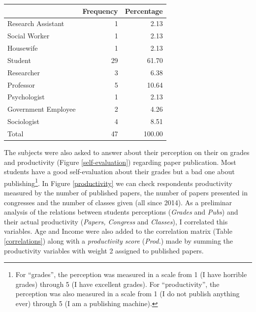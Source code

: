 \documentclass[a4paper, 12pt, openright, oneside, article, german, french, brazil, english]{abntex2}
\begin{document}
\begin{table}[ht]
	{\begin{tabular}{lrr}
		\hline
		& Frequency & Percentage \\ 
		\hline
		Research Assistant &   1 & 2.13 \\ 
		Social Worker &   1 & 2.13 \\ 
		Housewife &   1 & 2.13 \\ 
		Student &  29 & 61.70 \\ 
		Researcher &   3 & 6.38 \\ 
		Professor &   5 & 10.64 \\ 
		Psychologist &   1 & 2.13 \\ 
		Government Employee &   2 & 4.26 \\ 
		Sociologist &   4 & 8.51 \\ 
		Total &  47 & 100.00 \\ 
		\hline
	\end{tabular}
}
	{}
\end{table}

The subjects were also asked to answer about their perception on their on grades and productivity (Figure \ref{self-evaluation}) regarding paper publication. Most students have a good self-evaluation about their grades but a bad one about publishing\footnote{For ``grades'', the perception was measured in a scale from 1 (I have horrible grades) through 5 (I have excellent grades). For ``productivity'', the perception was also measured in a scale from 1 (I do not publish anything ever) through 5 (I am a publishing machine).}. In Figure \ref{productivity} we can check respondents productivity measured by the number of published papers, the number of papers presented in congresses and the number of classes given (all since 2014). As a preliminar analysis of the relations between students perceptions (\textit{Grades} and \textit{Pubs}) and their actual productivity (\textit{Papers, Congress} and \textit{Classes}), I correlated this variables. Age and Income were also added to the correlation matrix (Table \ref{correlations}) along with a \textit{productivity score} (\textit{Prod.}) made by summing the productivity variables with weight 2 assigned to published papers.
\end{document}
